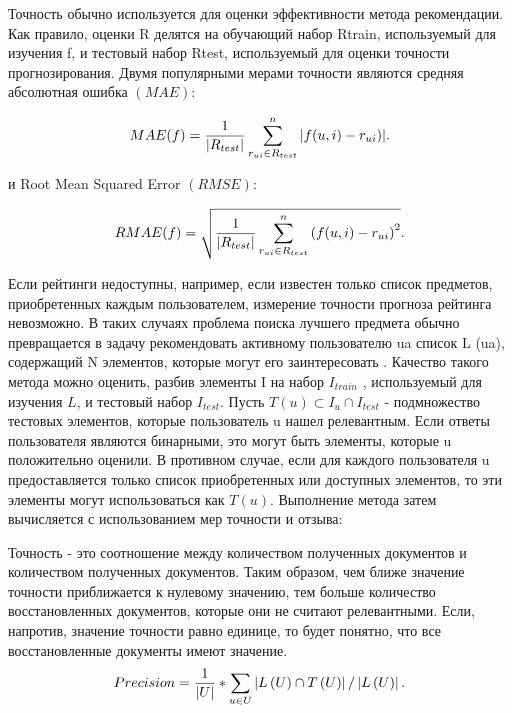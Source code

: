 Точность обычно используется для оценки эффективности метода рекомендации. Как правило, оценки R делятся на обучающий набор Rtrain, используемый для изучения f, и тестовый набор Rtest, используемый для оценки точности прогнозирования. Двумя популярными мерами точности являются средняя абсолютная ошибка $(MAE)$:

\begin{equation}
MAE (f)=\frac{1}{|R_{test}|}\sum_{r_{ui}\in R_{test}}^{n}|f(u,i)-r_{ui})| \\.
\label{F:F2}
\end{equation}

и Root Mean Squared Error $(RMSE)$:


\begin{equation}
RMAE (f)=\sqrt{\frac{1}{|R_{test}|}\sum_{r_{ui}\in R_{test}}^{n} \left ( f(u,i)-r_{ui} \right )^{2} }\\.
\label{F:F3}
\end{equation}


Если рейтинги недоступны, например, если известен только список предметов, приобретенных каждым пользователем, измерение точности прогноза рейтинга невозможно. В таких случаях проблема поиска лучшего предмета обычно превращается в задачу рекомендовать активному пользователю ua список L (ua), содержащий N элементов, которые могут его заинтересовать \cite{topn}. Качество такого метода можно оценить, разбив элементы I на набор $I_{train}$ , используемый для изучения $L$, и тестовый набор $I_{test}$. Пусть $T\left ( u \right )\subset I_{u}\cap I_{test}$ - подмножество тестовых элементов, которые пользователь u нашел релевантным. Если ответы пользователя являются бинарными, это могут быть элементы, которые u положительно оценили. В противном случае, если для каждого пользователя u предоставляется только список приобретенных или доступных элементов, то эти элементы могут использоваться как $T\left ( u \right )$. Выполнение метода затем вычисляется с использованием мер точности и отзыва:

Точность - это соотношение между количеством полученных документов и количеством полученных документов. Таким образом, чем ближе значение точности приближается к нулевому значению, тем больше количество восстановленных документов, которые они не считают релевантными. Если, напротив, значение точности равно единице, то будет понятно, что все восстановленные документы имеют значение.
\\
\begin{equation}
Precision =\frac{1}{\left | U \right |}*\sum_{u\in U}^{  } \left |L\left ( U \right )\cap  T\left ( U \right ) \right |/\left | L\left ( U \right ) \right |\\.
\label{F:F4}
\end{equation}

